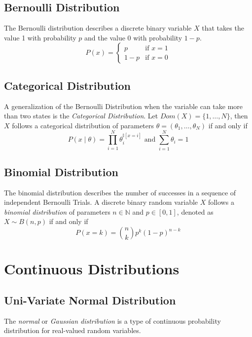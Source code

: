 \subsection{Bernoulli Distribution}

The Bernoulli distribution describes a discrete binary variable \(X\) that takes
the value 1 with probability \(p\) and the value 0 with probability \(1-p\).
\[
  P(x) =
\left\{
  \begin{array}{ll}
    p  & \mbox{if } x = 1 \\
    1-p & \mbox{if } x = 0
  \end{array}
\right.
\]

\subsection{Categorical Distribution}

A generalization of the Bernoulli Distribution when the variable can take more than two states is the \emph{Categorical Distribution}. Let \(Dom(X) = \{1,\dots,N\}\), then \(X\) follows a categorical distribution of parameters \(\theta = (\theta_{1},\dots, \theta_{N})\) if and only if
\[
  P(x \mid \theta) = \prod_{i=1}^{N}\theta_{i}^{\mathbb{I}[x = i]} \text{ and } \sum_{i = 1}^{N}\theta_{i} = 1
\]

\subsection{Binomial Distribution}

The binomial distribution describes the number of successes in a sequence of
independent Bernoulli Trials. A discrete binary random variable \(X\) follows a
\emph{binomial distribution} of parameters \(n \in \mathbb{N}\) and \(p \in
[0,1]\), denoted as \(X \sim B(n, p)\) if and only if
\[
  P(x = k) = \binom{n}{k}p^k(1-p)^{n-k}
\]


\section{Continuous Distributions}

\subsection{Uni-Variate Normal Distribution}

The \emph{normal} or \emph{Gaussian distribution} is a type of continuous
probability distribution for real-valued random variables.

